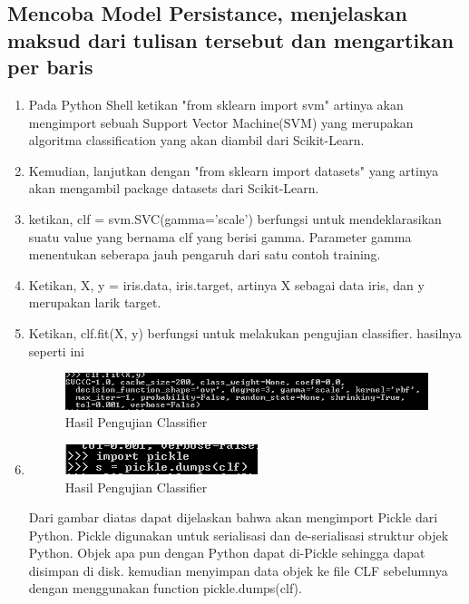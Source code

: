 \subsection{Mencoba Model Persistance, menjelaskan maksud dari tulisan tersebut dan mengartikan per baris}
\begin{enumerate}
\item
Pada Python Shell ketikan "from sklearn import svm" artinya akan mengimport sebuah Support Vector Machine(SVM) yang merupakan algoritma classification yang akan diambil dari Scikit-Learn.
\item
Kemudian, lanjutkan dengan "from sklearn import datasets" yang artinya akan mengambil package datasets dari Scikit-Learn.
\item
ketikan, clf = svm.SVC(gamma='scale') berfungsi untuk mendeklarasikan suatu value yang bernama clf yang berisi gamma. Parameter gamma menentukan seberapa jauh pengaruh dari satu contoh training.
\item
Ketikan, X, y = iris.data, iris.target, artinya X sebagai data iris, dan y merupakan larik target.
\item
Ketikan, clf.fit(X, y) berfungsi untuk melakukan pengujian classifier. hasilnya seperti ini
\begin{figure}
	\begin{center}
   	 \includegraphics[scale=1]{figures/tasya7.png}
   	 \caption{Hasil Pengujian Classifier}	
	\end{center}
\end{figure}
\item
\begin{figure}
	\begin{center}
   	 \includegraphics[scale=1]{figures/tasya8.png}
   	 \caption{Hasil Pengujian Classifier}	
	\end{center}
\end{figure}
Dari gambar diatas dapat dijelaskan bahwa akan mengimport Pickle dari Python. Pickle digunakan untuk serialisasi dan de-serialisasi struktur objek Python. Objek apa pun dengan Python dapat di-Pickle sehingga dapat disimpan di disk. kemudian menyimpan data objek ke file CLF sebelumnya dengan menggunakan function pickle.dumps(clf).

\end{enumerate}
